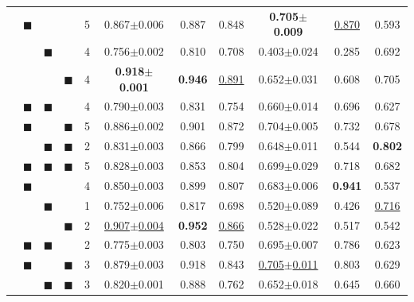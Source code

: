 \documentclass[11pt]{article}
\newcommand{\bs}[0]{$\blacksquare$}
\newcommand{\albert}{\mbox{AlBERTo}}
\begin{document}
\begin{table}[t]
\begin{tabular}{l|c@{\hspace{1mm}}c@{\hspace{1mm}}c@{\hspace{1mm}}|c@{\hspace{1mm}}|ccc|ccc}
        &  \bs  &      &      &      5 &      0.867$\pm$0.006 &     0.887 &       0.848 &  \bf  0.705$\pm$0.009 &  \ul{0.870}&       0.593 \\ %
        &       &  \bs &      &      4 &      0.756$\pm$0.002 &     0.810 &       0.708 &       0.403$\pm$0.024 &      0.285 &       0.692 \\ %
        &       &      &  \bs &      4 & \bf  0.918$\pm$0.001 & \bf 0.946 &   \ul{0.891}&       0.652$\pm$0.031 &      0.608 &       0.705 \\ %
        &  \bs  &  \bs &      &      4 &      0.790$\pm$0.003 &     0.831 &       0.754 &       0.660$\pm$0.014 &      0.696 &       0.627 \\ %
        &  \bs  &      &  \bs &      5 &      0.886$\pm$0.002 &     0.901 &       0.872 &       0.704$\pm$0.005 &      0.732 &       0.678 \\ %
        &       &  \bs &  \bs &      2 &      0.831$\pm$0.003 &     0.866 &       0.799 &       0.648$\pm$0.011 &      0.544 &  \bf  0.802 \\ %
        &  \bs  &  \bs &  \bs &      5 &      0.828$\pm$0.003 &     0.853 &       0.804 &       0.699$\pm$0.029 &      0.718 &       0.682 \\ %
        \hline
        \hline
        \multirow{7}{*}[0pt]{\rotatebox[origin=c]{90}{\begin{minipage}{1.7cm}\albert\end{minipage}}}
        &  \bs  &      &      &      4 &      0.850$\pm$0.003 &     0.899 &       0.807 &       0.683$\pm$0.006 & \bf  0.941 &       0.537 \\ %
        &       &  \bs &      &      1 &      0.752$\pm$0.006 &     0.817 &       0.698 &       0.520$\pm$0.089 &      0.426 &   \ul{0.716}\\ %
        &       &      &  \bs &      2 & \ul{0.907$\pm$0.004} & \bf 0.952 &  \ul{0.866} &       0.528$\pm$0.022 &      0.517 &       0.542 \\ %
        &  \bs  &  \bs &      &      2 &      0.775$\pm$0.003 &     0.803 &       0.750 &       0.695$\pm$0.007 &      0.786 &       0.623 \\ %
        &  \bs  &      &  \bs &      3 &      0.879$\pm$0.003 &     0.918 &       0.843 &  \ul{0.705$\pm$0.011} &      0.803 &       0.629 \\ %
        &       &  \bs &  \bs &      3 &      0.820$\pm$0.001 &     0.888 &       0.762 &       0.652$\pm$0.018 &      0.645 &       0.660 \\ %

\end{tabular}
\end{table}
\end{document}
